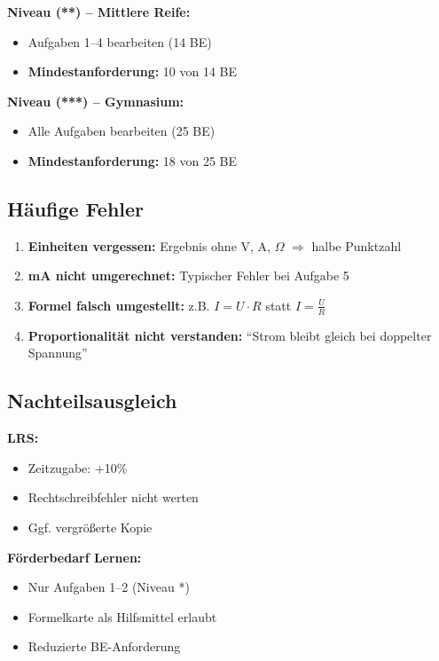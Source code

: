 \documentclass[11pt, a4paper]{article}
\begin{document}
\textbf{Niveau (**) -- Mittlere Reife:}
\begin{itemize}
    \item Aufgaben 1--4 bearbeiten (14 BE)
    \item \textbf{Mindestanforderung:} 10 von 14 BE
\end{itemize}

\textbf{Niveau (***) -- Gymnasium:}
\begin{itemize}
    \item Alle Aufgaben bearbeiten (25 BE)
    \item \textbf{Mindestanforderung:} 18 von 25 BE
\end{itemize}

\vspace{1.5em}

\subsection*{Häufige Fehler}

\begin{enumerate}
    \item \textbf{Einheiten vergessen:} Ergebnis ohne V, A, $\Omega$ $\Rightarrow$ halbe Punktzahl
    \item \textbf{mA nicht umgerechnet:} Typischer Fehler bei Aufgabe 5
    \item \textbf{Formel falsch umgestellt:} z.B. $I = U \cdot R$ statt $I = \frac{U}{R}$
    \item \textbf{Proportionalität nicht verstanden:} ``Strom bleibt gleich bei doppelter Spannung''
\end{enumerate}

\vspace{1.5em}

\subsection*{Nachteilsausgleich}

\textbf{LRS:}
\begin{itemize}
    \item Zeitzugabe: +10\%
    \item Rechtschreibfehler nicht werten
    \item Ggf. vergrößerte Kopie
\end{itemize}

\textbf{Förderbedarf Lernen:}
\begin{itemize}
    \item Nur Aufgaben 1--2 (Niveau *)
    \item Formelkarte als Hilfsmittel erlaubt
    \item Reduzierte BE-Anforderung
\end{itemize}

\end{document}
